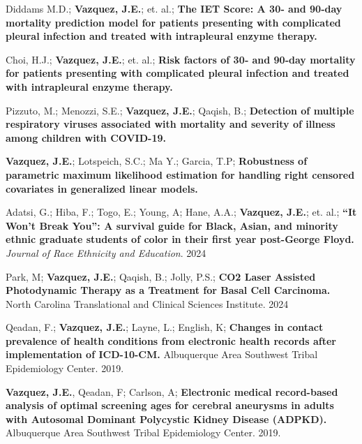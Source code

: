 \begin{cventries}
{\begin{etaremune}
    \item Diddams M.D.; {\bf Vazquez, J.E.}; et. al.; \textbf{The IET Score: A 30‑ and 90‑day mortality prediction model for patients presenting with complicated pleural infection and treated with intrapleural enzyme therapy.} 

    \item Choi, H.J.; {\bf Vazquez, J.E.}; et. al.; \textbf{Risk factors of 30‑ and 90‑day mortality for patients presenting with complicated pleural infection and treated with intrapleural enzyme therapy.}

    \item Pizzuto, M.; Menozzi, S.E.; {\bf Vazquez, J.E.}; Qaqish, B.; \textbf{Detection of multiple respiratory viruses associated with mortality and severity of illness among children with COVID-19.}

    \item {\bf Vazquez, J.E.}; Lotspeich, S.C.; Ma Y.; Garcia, T.P;  \textbf{Robustness of parametric maximum likelihood estimation for handling right censored covariates in generalized linear models.}
      

\end{etaremune}

}


\begin{etaremune}

    \item Adatsi, G.; Hiba, F.; Togo, E.; Young, A; Hane, A.A.; {\bf Vazquez, J.E.}; et. al.; \textbf{“It Won’t Break You”: A survival guide for Black, Asian, and minority ethnic graduate students of color in their first year post-George Floyd.} \textit{Journal of Race Ethnicity and Education}. 2024
    
    \item Park, M; {\bf Vazquez, J.E.}; Qaqish, B.; Jolly, P.S.; \textbf{CO2 Laser Assisted Photodynamic Therapy as a Treatment for Basal Cell Carcinoma.} North Carolina Translational and Clinical Sciences Institute. 2024
        
   \item Qeadan, F.; {\bf Vazquez, J.E.}; Layne, L.; English, K;  \textbf{Changes in contact prevalence of health conditions from electronic health records after implementation of ICD-10-CM. }Albuquerque Area Southwest Tribal Epidemiology Center. 2019.

\item {\bf Vazquez, J.E.}, Qeadan, F; Carlson, A;  \textbf{Electronic medical record-based analysis of optimal screening ages for cerebral aneurysms in adults with Autosomal Dominant Polycystic Kidney Disease (ADPKD).} Albuquerque Area Southwest Tribal Epidemiology Center. 2019.


\end{etaremune}
\end{cventries}
